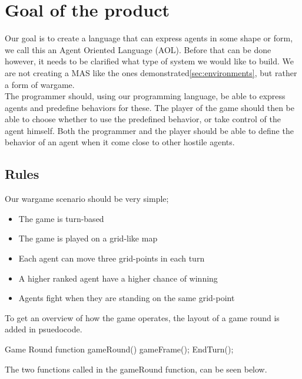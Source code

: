 \chapter{Goal of the product}

Our goal is to create a language that can express agents in some shape or form, we call this an Agent Oriented Language (AOL). Before that can be done however, it needs to be clarified what type of system we would like to build. We are not creating a MAS like the ones demonstrated\ref{sec:environments}, but rather a form of wargame.\\
\indent The programmer should, using our programming language, be able to express agents and predefine behaviors for these. The player of the game should then be able to choose whether to use the predefined behavior, or take control of the agent himself. Both the programmer and the player should be able to define the behavior of an agent when it come close to other hostile agents. \\

\section{Rules}
Our wargame scenario should be very simple;
\begin{itemize}
	\item The game is turn-based
	\item The game is played on a grid-like map
	\item Each agent can move three grid-points in each turn
	\item A higher ranked agent have a higher chance of winning
	\item Agents fight when they are standing on the same grid-point
\end{itemize}

To get an overview of how the game operates, the layout of a game round is added in psuedocode.

\begin{source}{Game Round}{}
function gameRound()
{
	gameFrame();
	EndTurn();
}
\end{source}

The two functions called in the gameRound function, can be seen below.

